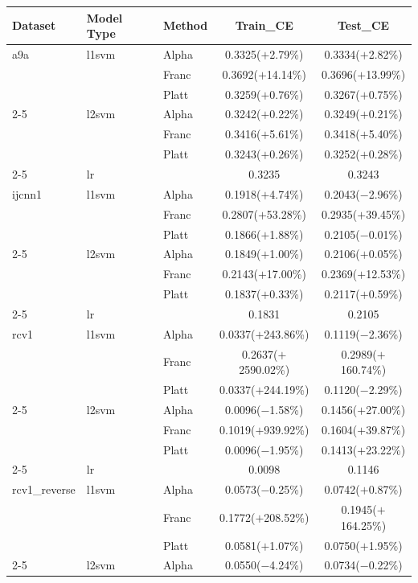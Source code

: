 \begin{tabular}{@{}lllcc@{}}
Dataset & Model Type & Method & Train\_CE & Test\_CE \\
\hline
a9a & l1svm & Alpha & 0.3325($+$2.79\%) & 0.3334($+$2.82\%) \\
 &  & Franc & 0.3692($+$14.14\%) & 0.3696($+$13.99\%) \\
 &  & Platt & 0.3259($+$0.76\%) & 0.3267($+$0.75\%) \\
\cline{2-5}
 & l2svm & Alpha & 0.3242($+$0.22\%) & 0.3249($+$0.21\%) \\
 &  & Franc & 0.3416($+$5.61\%) & 0.3418($+$5.40\%) \\
 &  & Platt & 0.3243($+$0.26\%) & 0.3252($+$0.28\%) \\
\cline{2-5}
 & lr &  & 0.3235 & 0.3243 \\
\hline
ijcnn1 & l1svm & Alpha & 0.1918($+$4.74\%) & 0.2043($-$2.96\%) \\
 &  & Franc & 0.2807($+$53.28\%) & 0.2935($+$39.45\%) \\
 &  & Platt & 0.1866($+$1.88\%) & 0.2105($-$0.01\%) \\
\cline{2-5}
 & l2svm & Alpha & 0.1849($+$1.00\%) & 0.2106($+$0.05\%) \\
 &  & Franc & 0.2143($+$17.00\%) & 0.2369($+$12.53\%) \\
 &  & Platt & 0.1837($+$0.33\%) & 0.2117($+$0.59\%) \\
\cline{2-5}
 & lr &  & 0.1831 & 0.2105 \\
\hline
rcv1 & l1svm & Alpha & 0.0337($+$243.86\%) & 0.1119($-$2.36\%) \\
 &  & Franc & 0.2637($+$2590.02\%) & 0.2989($+$160.74\%) \\
 &  & Platt & 0.0337($+$244.19\%) & 0.1120($-$2.29\%) \\
\cline{2-5}
 & l2svm & Alpha & 0.0096($-$1.58\%) & 0.1456($+$27.00\%) \\
 &  & Franc & 0.1019($+$939.92\%) & 0.1604($+$39.87\%) \\
 &  & Platt & 0.0096($-$1.95\%) & 0.1413($+$23.22\%) \\
\cline{2-5}
 & lr &  & 0.0098 & 0.1146 \\
\hline
rcv1\_reverse & l1svm & Alpha & 0.0573($-$0.25\%) & 0.0742($+$0.87\%) \\
 &  & Franc & 0.1772($+$208.52\%) & 0.1945($+$164.25\%) \\
 &  & Platt & 0.0581($+$1.07\%) & 0.0750($+$1.95\%) \\
\cline{2-5}
 & l2svm & Alpha & 0.0550($-$4.24\%) & 0.0734($-$0.22\%) \\

\end{tabular}
